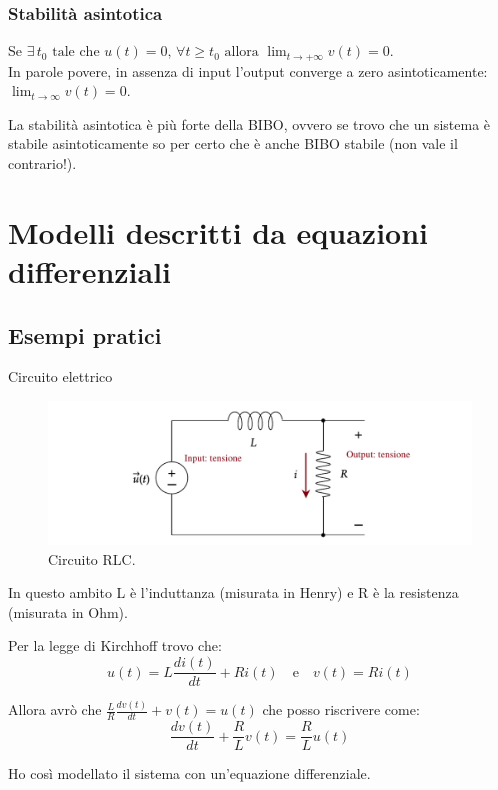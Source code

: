 		\subsubsection{Stabilità asintotica}


			Se $\exists \, t_0 \text{ tale che } u(t)=0 \text{, } \forall t \ge t_0 \text{ allora } \lim_{t \to +\infty} v(t)=0$.\\
			In parole povere, in assenza di input l'output converge a zero asintoticamente: $\lim_{t \to \infty} v(t)=0$.
			
			\begin{NB}				
			La stabilità asintotica è più forte della BIBO, ovvero se trovo che un sistema è stabile asintoticamente so per certo che è anche BIBO stabile (non vale il contrario!).
			\end{NB}

	
\section{Modelli descritti da equazioni differenziali}

\subsection{Esempi pratici}
\begin{nexample}
	Circuito elettrico
	
		\begin{figure}[H]
			\centering
			\includegraphics[scale=0.75]{immagini/cap3_Sistemi/circuito_RLC.pdf}
			\caption{ Circuito RLC. }
			\label{fig: circuito_RLC}
		\end{figure}
	 	In questo ambito L è l'induttanza (misurata in Henry) e R è la resistenza (misurata in Ohm). 
 	
	 	Per la legge di Kirchhoff trovo che: 
	 	\[ u(t) = L \frac{di(t)}{dt} + R i(t) \quad \text{e} \quad v(t) = R i(t) \]
	 	
	 	Allora avrò che $ \frac{L}{R} \frac{dv(t)}{dt} + v(t) = u(t)$ che posso riscrivere come:
	 	  \[ \frac{dv(t)}{dt} + \frac{R}{L} v(t) = \frac{R}{L} u(t) \]
	 	  
	 	Ho così modellato il sistema con un'equazione differenziale.
\end{nexample}

